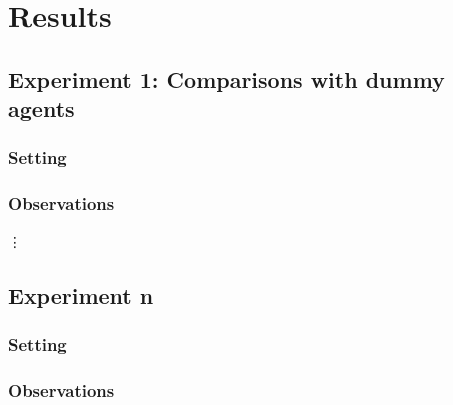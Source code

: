 \documentclass[11pt]{article}
\begin{document}
\section{Results}

\subsection{Experiment 1: Comparisons with dummy agents}

\subsubsection{Setting}

\subsubsection{Observations}

\vdots

\subsection{Experiment n}

\subsubsection{Setting}

\subsubsection{Observations}
\end{document}
